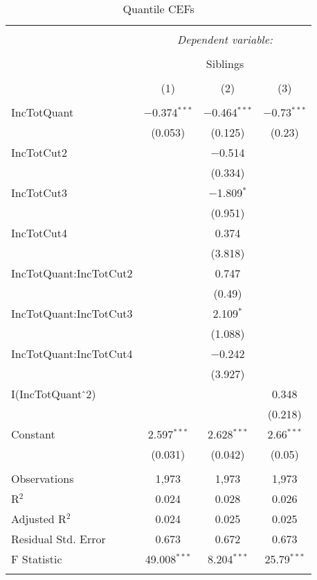 
\begin{table}[H] \centering 
  \caption{Quantile CEFs} 
  \label{} 
\begin{tabular}{@{\extracolsep{5pt}}lccc} 
\\[-1.8ex]\hline 
\hline \\[-1.8ex] 
 & \multicolumn{3}{c}{\textit{Dependent variable:}} \\ 
\cline{2-4} 
\\[-1.8ex] & \multicolumn{3}{c}{Siblings} \\ 
\\[-1.8ex] & (1) & (2) & (3)\\ 
\hline \\[-1.8ex] 
 IncTotQuant & $-$0.374$^{***}$ & $-$0.464$^{***}$ & $-$0.73$^{***}$ \\ 
  & (0.053) & (0.125) & (0.23) \\ 
  IncTotCut2 &  & $-$0.514 &  \\ 
  &  & (0.334) &  \\ 
  IncTotCut3 &  & $-$1.809$^{*}$ &  \\ 
  &  & (0.951) &  \\ 
  IncTotCut4 &  & 0.374 &  \\ 
  &  & (3.818) &  \\ 
  IncTotQuant:IncTotCut2 &  & 0.747 &  \\ 
  &  & (0.49) &  \\ 
  IncTotQuant:IncTotCut3 &  & 2.109$^{*}$ &  \\ 
  &  & (1.088) &  \\ 
  IncTotQuant:IncTotCut4 &  & $-$0.242 &  \\ 
  &  & (3.927) &  \\ 
  I(IncTotQuant$\hat{\mkern6mu}$2) &  &  & 0.348 \\ 
  &  &  & (0.218) \\ 
  Constant & 2.597$^{***}$ & 2.628$^{***}$ & 2.66$^{***}$ \\ 
  & (0.031) & (0.042) & (0.05) \\ 
 \hline \\[-1.8ex] 
Observations & 1,973 & 1,973 & 1,973 \\ 
R$^{2}$ & 0.024 & 0.028 & 0.026 \\ 
Adjusted R$^{2}$ & 0.024 & 0.025 & 0.025 \\ 
Residual Std. Error & 0.673 & 0.672 & 0.673 \\ 
F Statistic & 49.008$^{***}$ & 8.204$^{***}$ & 25.79$^{***}$ \\ 
\hline 
\hline \\[-1.8ex] 
\end{tabular} 
\end{table} 
